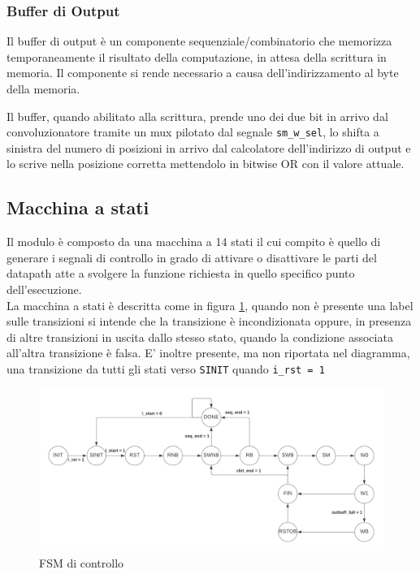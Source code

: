 \documentclass[12pt, a4paper]{article}
\begin{document}
\subsubsection{Buffer di Output}

Il buffer di output è un componente sequenziale/combinatorio che memorizza temporaneamente il risultato della
computazione, in attesa della scrittura in memoria. 
Il componente si rende necessario a causa dell'indirizzamento al byte della memoria.

\pagebreak

\noindent Il buffer, quando abilitato alla scrittura, prende uno dei due bit in arrivo dal convoluzionatore tramite un mux 
pilotato dal segnale \texttt{sm\_w\_sel}, lo shifta a sinistra del numero di posizioni in arrivo
dal calcolatore dell'indirizzo di output e lo scrive nella posizione corretta 
mettendolo in bitwise OR con il valore attuale.


\subsection{Macchina a stati}

Il modulo è composto da una macchina a 14 stati il cui compito è quello di generare
i segnali di controllo in grado di attivare o disattivare le parti del datapath atte a
svolgere la funzione richiesta in quello specifico punto dell'esecuzione.\\

\noindent La macchina a stati è descritta come in figura \ref{fig:ctrl_fsm}, quando non è presente una label sulle transizioni
si intende che la transizione è incondizionata oppure, in presenza di altre transizioni
in uscita dallo stesso stato, quando la condizione associata all'altra transizione è falsa.
E' inoltre presente, ma non riportata nel diagramma, una transizione da tutti gli stati 
verso \texttt{SINIT} quando \texttt{i\_rst = 1}

\begin{figure}[!h]
    \centering
    \includegraphics[scale=0.3]{fsm_controllo.png}
    \caption{FSM di controllo}
    \label{fig:ctrl_fsm}
\end{figure}
\end{document}

